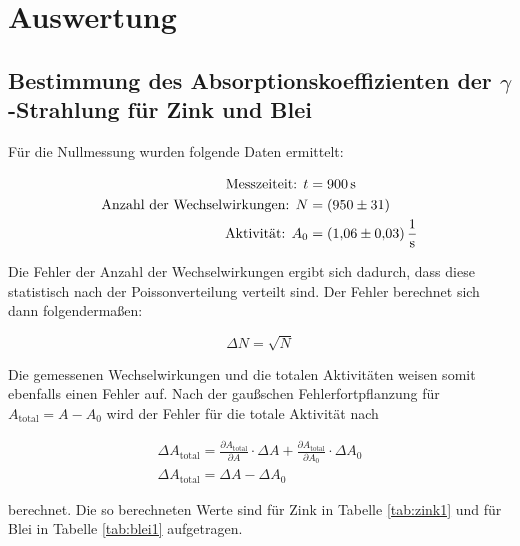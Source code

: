 \section{Auswertung}
\label{sec:Auswertung}

\subsection{Bestimmung des Absorptionskoeffizienten der \texorpdfstring{$\gamma$}{Gamma}-Strahlung für Zink und Blei}
\FloatBarrier
Für die Nullmessung wurden folgende Daten ermittelt:

\begin{align*}
  \text{Messzeiteit: } t &= \SI{900}{\second} \\
  \text{Anzahl der Wechselwirkungen: } N &= (950 \pm 31) \\
  \text{Aktivität: } A_0 &= \SI{1.06 \pm 0.03}{\per\second}
\end{align*}

Die Fehler der Anzahl der Wechselwirkungen ergibt sich dadurch, dass diese statistisch nach der Poissonverteilung verteilt sind.
Der Fehler berechnet sich dann folgendermaßen:

\begin{equation}
  \Delta N = \sqrt{N}
  \label{eqn:nfehler}
\end{equation}

Die gemessenen Wechselwirkungen und die totalen Aktivitäten weisen somit ebenfalls einen Fehler auf.
Nach der gaußschen Fehlerfortpflanzung für $A_\text{total} = A - A_0$ wird der Fehler für die totale Aktivität nach

\begin{gather}
    \Delta A_\text{total} = \frac{\partial A_\text{total}}{\partial A} \cdot \Delta A + \frac{\partial A_\text{total}}{\partial A_0} \cdot \Delta A_0 \\
    \Delta A_\text{total} = \Delta A - \Delta A_0
    \label{eqn:afehler}
\end{gather}

berechnet.
Die so berechneten Werte sind für Zink in Tabelle \ref{tab:zink1} und für Blei in Tabelle \ref{tab:blei1} aufgetragen.

